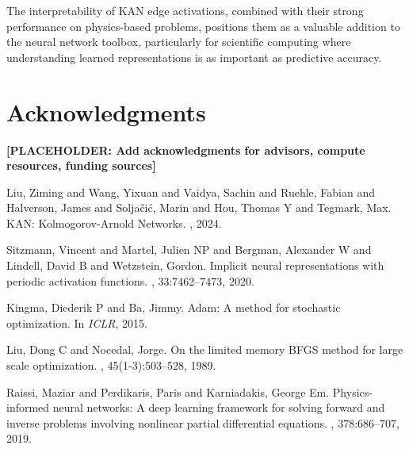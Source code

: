 \documentclass[11pt,a4paper]{article}
\begin{document}
The interpretability of KAN edge activations, combined with their strong performance on physics-based problems, positions them as a valuable addition to the neural network toolbox, particularly for scientific computing where understanding learned representations is as important as predictive accuracy.

\section*{Acknowledgments}

\textbf{[PLACEHOLDER: Add acknowledgments for advisors, compute resources, funding sources]}




\begin{thebibliography}{10}

Liu, Ziming and Wang, Yixuan and Vaidya, Sachin and Ruehle, Fabian and Halverson, James and Soljačić, Marin and Hou, Thomas Y and Tegmark, Max.
\newblock KAN: Kolmogorov-Arnold Networks.
, 2024.

Sitzmann, Vincent and Martel, Julien NP and Bergman, Alexander W and Lindell, David B and Wetzstein, Gordon.
\newblock Implicit neural representations with periodic activation functions.
, 33:7462--7473, 2020.

Kingma, Diederik P and Ba, Jimmy.
\newblock Adam: A method for stochastic optimization.
\newblock In {\em ICLR}, 2015.

Liu, Dong C and Nocedal, Jorge.
\newblock On the limited memory BFGS method for large scale optimization.
, 45(1-3):503--528, 1989.

Raissi, Maziar and Perdikaris, Paris and Karniadakis, George Em.
\newblock Physics-informed neural networks: A deep learning framework for solving forward and inverse problems involving nonlinear partial differential equations.
, 378:686--707, 2019.

\end{thebibliography}
\end{document}

